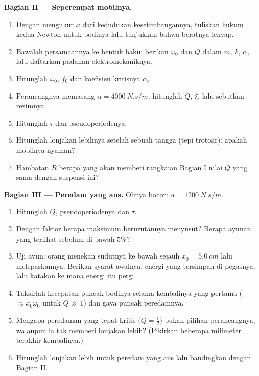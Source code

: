 \begin{problem}
\medskip
\noindent\textbf{Bagian II --- Seperempat mobilnya.}
\begin{enumerate}[resume]
  \item Dengan mengukur $x$ dari kedudukan kesetimbangannya, tuliskan
        hukum kedua Newton untuk bodinya lalu tunjukkan bahwa beratnya lenyap.
  \item Bawalah persamaannya ke bentuk baku; berikan $\omega_0$ dan $Q$
        dalam $m$, $k$, $\alpha$, lalu daftarkan padanan
        elektromekaniknya.
  \item Hitunglah $\omega_0$, $f_0$ dan koefisien kritisnya
        $\alpha_c$.
  \item Perancangnya memasang $\alpha = \qty{4000}{N.s/m}$: hitunglah
        $Q$, $\xi$, lalu sebutkan rezimnya.
  \item Hitunglah $\tau$ dan pseudoperiodenya.
  \item Hitunglah lonjakan lebihnya setelah sebuah tangga (tepi
        trotoar): apakah mobilnya nyaman?
  \item Hambatan $R$ berapa yang akan memberi rangkaian Bagian I nilai
        $Q$ yang sama dengan suspensi ini?
\end{enumerate}

\medskip
\noindent\textbf{Bagian III --- Peredam yang aus.}
Olinya bocor: $\alpha = \qty{1200}{N.s/m}$.
\begin{enumerate}[resume]
  \item Hitunglah $Q$, pseudoperiodenya dan $\tau$.
  \item Dengan faktor berapa maksimum berurutannya menyusut? Berapa
        ayunan yang terlihat sebelum  di bawah $5\%$?
  \item Uji ayun: orang menekan sudutnya ke bawah sejauh $x_0 =
        \qty{5.0}{cm}$ lalu melepaskannya. Berikan syarat awalnya,
        energi yang tersimpan di pegasnya, lalu katakan ke mana energi
        itu pergi.
  \item Taksirlah kecepatan puncak bodinya selama kembalinya yang
        pertama ($\approx x_0\omega_0$ untuk $Q \gg 1$) dan gaya puncak
        peredamnya.
  \item Mengapa peredaman yang tepat kritis ($Q = \tfrac12$) bukan
        pilihan perancangnya, walaupun ia tak memberi lonjakan lebih?
        (Pikirkan beberapa milimeter terakhir kembalinya.)
  \item Hitunglah lonjakan lebih untuk peredam yang aus lalu bandingkan
        dengan Bagian II.
\end{enumerate}


\end{problem}

